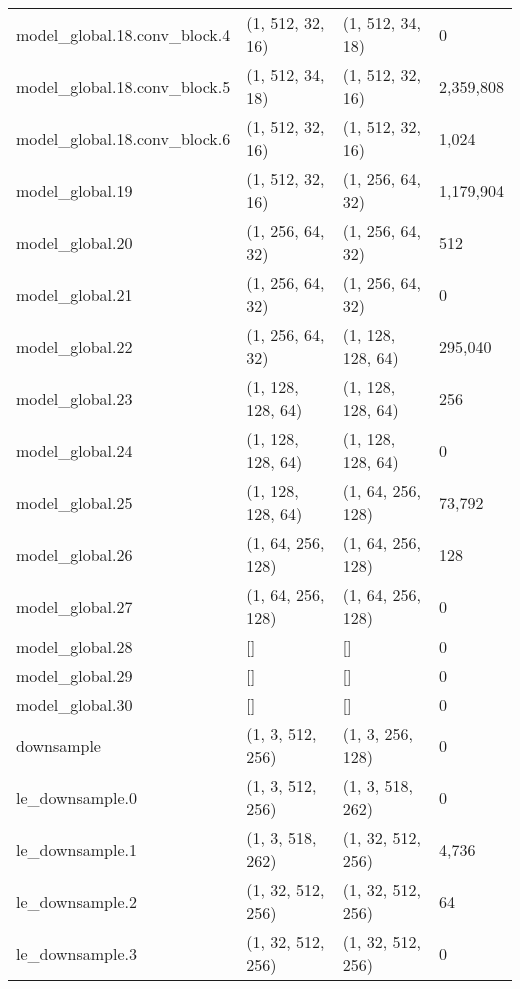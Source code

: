 \begin{longtable}{llll}
        model\_global.18.conv\_block.4 &   (1, 512, 32, 16) &   (1, 512, 34, 18) &           0 \\
        model\_global.18.conv\_block.5 &   (1, 512, 34, 18) &   (1, 512, 32, 16) &   2,359,808 \\
        model\_global.18.conv\_block.6 &   (1, 512, 32, 16) &   (1, 512, 32, 16) &       1,024 \\
                    model\_global.19 &   (1, 512, 32, 16) &   (1, 256, 64, 32) &   1,179,904 \\
                    model\_global.20 &   (1, 256, 64, 32) &   (1, 256, 64, 32) &         512 \\
                    model\_global.21 &   (1, 256, 64, 32) &   (1, 256, 64, 32) &           0 \\
                    model\_global.22 &   (1, 256, 64, 32) &  (1, 128, 128, 64) &     295,040 \\
                    model\_global.23 &  (1, 128, 128, 64) &  (1, 128, 128, 64) &         256 \\
                    model\_global.24 &  (1, 128, 128, 64) &  (1, 128, 128, 64) &           0 \\
                    model\_global.25 &  (1, 128, 128, 64) &  (1, 64, 256, 128) &      73,792 \\
                    model\_global.26 &  (1, 64, 256, 128) &  (1, 64, 256, 128) &         128 \\
                    model\_global.27 &  (1, 64, 256, 128) &  (1, 64, 256, 128) &           0 \\
                    model\_global.28 &                 [] &                 [] &           0 \\
                    model\_global.29 &                 [] &                 [] &           0 \\
                    model\_global.30 &                 [] &                 [] &           0 \\
                        downsample &   (1, 3, 512, 256) &   (1, 3, 256, 128) &           0 \\
                    le\_downsample.0 &   (1, 3, 512, 256) &   (1, 3, 518, 262) &           0 \\
                    le\_downsample.1 &   (1, 3, 518, 262) &  (1, 32, 512, 256) &       4,736 \\
                    le\_downsample.2 &  (1, 32, 512, 256) &  (1, 32, 512, 256) &          64 \\
                    le\_downsample.3 &  (1, 32, 512, 256) &  (1, 32, 512, 256) &           0 \\

\end{longtable}
